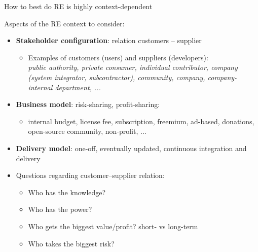 

\begin{Slide}{How to best do RE is highly context-dependent}

Aspects of the RE context to consider: 
\begin{itemize}
\item \textbf{Stakeholder configuration}: relation customers -- supplier  
\begin{itemize}
\item Examples of customers (users) and suppliers (developers): \\
    \textit{public authority, private consumer, individual contributor, company (system integrator, subcontractor), community, company, company-internal department, ...}
\end{itemize}
\item \textbf{Business model}: risk-sharing, profit-sharing: \\
\begin{itemize}
\item internal budget, license fee, subscription, freemium, ad-based, donations, open-source community, non-profit, ... 
\end{itemize}
\item \textbf{Delivery model}: one-off, eventually updated, continuous integration and delivery

\item Questions regarding customer--supplier relation:
\begin{itemize}
\item Who has the knowledge?
\item Who has the power?
\item Who gets the biggest value/profit? short- vs long-term
\item Who takes the biggest risk?


\end{itemize}
\end{itemize}
\end{Slide}